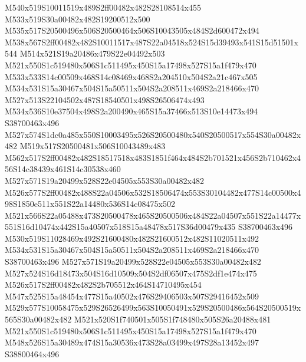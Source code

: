 \documentclass{article}
\begin{document}
\begin{multicols}{2}
M540x519S10011519x489S2ff00482x482S28108514x455 M533x519S30a00482x482S19200512x500 M535x517S20500496x506S20500464x506S10043505x484S2d600472x494 M538x567S2ff00482x482S10011517x487S22a04518x524S15d39493x541S15d51501x544 M514x521S19a20486x479S22e04492x503 M521x550S1c519480x506S1c511495x450S15a17498x527S15a1f479x470 M533x533S14c00509x468S14c08469x468S2a204510x504S2a21c467x505 M534x531S15a30467x504S15a50511x504S2a208511x469S2a218466x470 M527x513S22104502x487S18540501x498S26506474x493 M534x536S10e37504x498S2a200490x465S15a37466x513S10e14473x494 S38700463x496 M527x574S1dc0a485x550S10003495x526S20500480x540S20500517x554S30a00482x482 M519x517S20500481x506S10043489x483 M562x517S2ff00482x482S18517518x483S1851f464x484S2b701521x456S2b710462x456S14c38439x461S14c30538x460 M527x571S19a20499x528S22e04505x553S30a00482x482 M526x577S2ff00482x488S22a04506x532S18506474x553S30104482x477S14c00500x498S1850e511x551S22a14480x536S14c08475x502 M521x566S22a05488x473S20500478x465S20500506x484S22a04507x551S22a14477x551S16d10474x442S15a40507x518S15a48478x517S36d00479x435 S38700463x496 M530x519S11028469x492S21600480x482S21600512x482S11020511x492 M534x531S15a30467x504S15a50511x504S2a208511x469S2a218466x470 S38700463x496 M527x571S19a20499x528S22e04505x553S30a00482x482 M527x524S16d18473x504S16d10509x504S2df06507x475S2df1e474x475 M526x517S2ff00482x482S2b705512x464S14710495x454 M547x525S15a48454x477S15a40502x476S29406503x507S29416452x509 M529x577S10058475x529S26526499x563S10050491x529S20500486x564S20500519x565S30a00482x482 M521x520S1f740501x505S1f748480x505S26a20488x481 M521x550S1c519480x506S1c511495x450S15a17498x527S15a1f479x470 M548x526S15a30489x474S15a30536x473S28a03499x497S28a13452x497 S38800464x496


\end{multicols}
\end{document}
